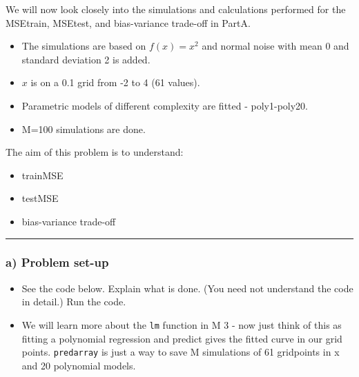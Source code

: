 \documentclass[]{article}
\providecommand{\tightlist}{%
  \setlength{\itemsep}{0pt}\setlength{\parskip}{0pt}}
\begin{document}
We will now look closely into the simulations and calculations performed
for the MSEtrain, MSEtest, and bias-variance trade-off in PartA.

\begin{itemize}
\tightlist
\item
  The simulations are based on \(f(x)=x^2\) and normal noise with mean 0
  and standard deviation 2 is added.
\item
  \(x\) is on a 0.1 grid from -2 to 4 (61 values).
\item
  Parametric models of different complexity are fitted - poly1-poly20.
\item
  M=100 simulations are done.
\end{itemize}

The aim of this problem is to understand:

\begin{itemize}
\tightlist
\item
  trainMSE
\item
  testMSE
\item
  bias-variance trade-off
\end{itemize}

\begin{center}\rule{0.5\linewidth}{\linethickness}\end{center}

\subsubsection{a) Problem set-up}\label{a-problem-set-up}

\begin{itemize}
\tightlist
\item
  See the code below. Explain what is done. (You need not understand the
  code in detail.) Run the code.
\item
  We will learn more about the \texttt{lm} function in M 3 - now just
  think of this as fitting a polynomial regression and predict gives the
  fitted curve in our grid points. \texttt{predarray} is just a way to
  save M simulations of 61 gridpoints in x and 20 polynomial models.
\end{itemize}
\end{document}
